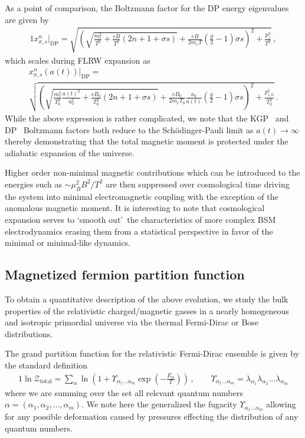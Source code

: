 As a point of comparison, the Boltzmann factor for the DP energy eigenvalues are given by
\begin{alignat}{1}
    \label{xscaledp:1} x_{\sigma,s}^{n}\vert_\mathrm{DP} = \sqrt{\left(\sqrt{\frac{m_{e}^{2}}{T^{2}}+\frac{eB}{T^{2}}\left(2n+1+\sigma s\right)}+\frac{eB}{2m_{e}T}\left(\frac{g}{2}-1\right)\sigma s\right)^{2}+\frac{p_{z}^{2}}{T^{2}}}\,,
\end{alignat}
which scales during FLRW expansion as
\begin{multline}
    \label{xscaledp:2} x_{\sigma,s}^{n}(a(t))\vert_\mathrm{DP} =\\ \sqrt{\left(\sqrt{\frac{m_{e}^{2}}{T_{0}^{2}}\frac{a(t)^{2}}{a_{0}^{2}}+\frac{eB_{0}}{T_{0}^{2}}\left(2n+1+\sigma s\right)}+\frac{eB_{0}}{2m_{e}T_{0}}\frac{a_{0}}{a(t)}\left(\frac{g}{2}-1\right)\sigma s\right)^{2}+\frac{p_{z,0}^{2}}{T_{0}^{2}}}\,.
\end{multline}
While the above expression is rather complicated, we note that the KGP~ and DP~ Boltzmann factors both reduce to the Sch{\"o}dinger-Pauli limit as $a(t)\rightarrow\infty$ thereby demonstrating that the total magnetic moment is protected under the adiabatic expansion of the universe.

Higher order non-minimal magnetic contributions which can be introduced to the energies such as $\sim\mu_{B}^{2}B^{2}/T^{2}$ are then suppressed over cosmological time driving the system into minimal electromagnetic coupling with the exception of the anomalous magnetic moment. It is interesting to note that cosmological expansion serves to \lq smooth out\rq\ the characteristics of more complex BSM electrodynamics erasing them from a statistical perspective in favor of the minimal or minimal-like dynamics.

\subsection{Magnetized fermion partition function}
\label{sec:partition}
\noindent To obtain a quantitative description of the above evolution, we study the bulk properties of the relativistic charged/magnetic gasses in a nearly homogeneous and isotropic primordial universe via the thermal Fermi-Dirac or Bose distributions.

The grand partition function for the relativistic Fermi-Dirac ensemble is given by the standard definition
\begin{alignat}{1}
    \label{part:1} \ln\mathcal{Z}_\mathrm{total}=\sum_{\alpha}\ln\left(1+\Upsilon_{\alpha_{1}\ldots\alpha_{m}}\exp\left(-\frac{E_{\alpha}}{T}\right)\right)\,,\qquad\Upsilon_{\alpha_{1}\ldots\alpha_{m}}=\lambda_{\alpha_{1}}\lambda_{\alpha_{2}}\ldots\lambda_{\alpha_{m}}
\end{alignat}
where we are summing over the set all relevant quantum numbers $\alpha=(\alpha_{1},\alpha_{2},\ldots,\alpha_{m})$. We note here the generalized the fugacity $\Upsilon_{\alpha_{1}\ldots\alpha_{m}}$ allowing for any possible deformation caused by pressures effecting the distribution of any quantum numbers.

